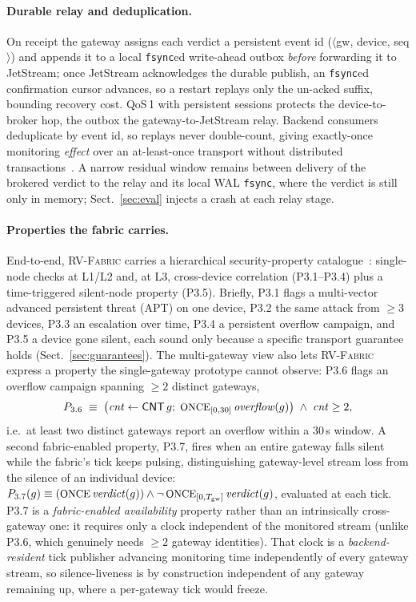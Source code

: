 \documentclass[runningheads]{llncs}
\newcommand{\sys}{\textsc{RV-Fabric}\xspace}
\begin{document}
\paragraph{Durable relay and deduplication.}
On receipt the gateway assigns each verdict a persistent event id
($\langle$gw, device, seq$\rangle$) and appends it to a local \texttt{fsync}ed write-ahead
outbox \emph{before} forwarding it to JetStream; once JetStream acknowledges the durable
publish, an \texttt{fsync}ed confirmation cursor advances, so a restart replays only the
un-acked suffix, bounding recovery cost. QoS\,1 with persistent sessions protects the
device-to-broker hop, the outbox the gateway-to-JetStream relay. Backend consumers
deduplicate by event id, so replays never double-count, giving exactly-once monitoring
\emph{effect} over an at-least-once transport without distributed
transactions~\cite{helland2007life}. A narrow residual window remains between delivery of
the brokered verdict to the relay and its local WAL \texttt{fsync}, where the verdict is
still only in memory; Sect.~\ref{sec:eval} injects a crash at each relay stage.

\paragraph{Properties the fabric carries.}
End-to-end, \sys carries a hierarchical security-property
catalogue~\cite{ares2026,csr2026}: single-node checks at L1/L2 and, at L3,
cross-device correlation (P3.1--P3.4) plus a time-triggered silent-node property
(P3.5). Briefly, P3.1 flags a multi-vector advanced persistent threat (APT) on one device, P3.2
the same attack from $\geq3$ devices, P3.3 an escalation over time, P3.4 a persistent
overflow campaign, and P3.5 a device gone silent, each sound only because a specific
transport guarantee holds (Sect.~\ref{sec:guarantees}). The
multi-gateway view also lets \sys express a property the single-gateway prototype
cannot observe: P3.6 flags an overflow campaign spanning $\geq2$ distinct
gateways,
\begin{equation}
P_{3.6}\;\equiv\;\big(\mathit{cnt}\leftarrow\mathsf{CNT}\,g;\;
\text{\small ONCE}_{[0,30]}\,\mathit{overflow}(g)\big)\;\wedge\;\mathit{cnt}\ge 2,
\label{eq:p36}
\end{equation}
i.e.\ at least two distinct gateways report an overflow within a 30\,s window.
A second fabric-enabled property, P3.7, fires when an entire gateway falls silent
while the fabric's tick keeps pulsing, distinguishing gateway-level stream loss
from the silence of an individual device:
$P_{3.7}(g)\equiv(\text{\small ONCE}\,\mathit{verdict}(g))\wedge
\neg\,\text{\small ONCE}_{[0,T_{\mathrm{gw}}]}\,\mathit{verdict}(g)$, evaluated at each tick.
P3.7 is a \emph{fabric-enabled availability} property rather than an intrinsically
cross-gateway one: it requires only a clock independent of the monitored stream (unlike
P3.6, which genuinely needs $\geq2$ gateway identities). That clock is a
\emph{backend-resident} tick publisher advancing monitoring time independently of every
gateway stream, so silence-liveness is by construction independent of any gateway remaining
up, where a per-gateway tick would freeze.
\end{document}
